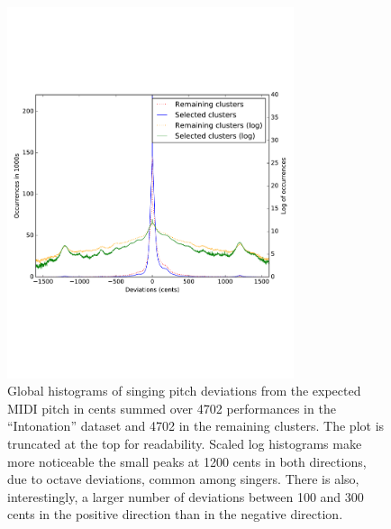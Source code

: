 \begin{appendices}
\begin{figure}[h!]
    \centering
    \includegraphics[width=0.75\textwidth]{figures/full_histograms_comparison.pdf}\vspace{-1in}
    \caption{Global histograms of singing pitch deviations from the expected MIDI pitch in cents summed over 4702 performances in the ``Intonation'' dataset and 4702 in the remaining clusters. The plot is truncated at the top for readability. Scaled log histograms make more noticeable the small peaks at 1200 cents in both directions, due to octave deviations, common among singers. There is also, interestingly, a larger number of deviations between 100 and 300 cents in the positive direction than in the negative direction.}
    \label{fig:full_hist}
\end{figure}


\end{appendices}
